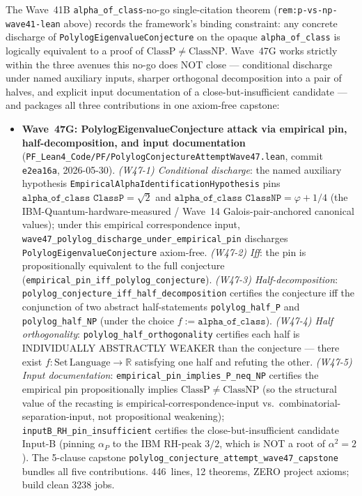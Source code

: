 \begin{remark}\label{rem:p-vs-np-wave47g-lean}
The Wave~41B \texttt{alpha\_of\_class}-no-go single-citation theorem (\texttt{rem:p-vs-np-wave41-lean} above) records the framework's binding constraint: any concrete discharge of \texttt{PolylogEigenvalueConjecture} on the opaque \texttt{alpha\_of\_class} is logically equivalent to a proof of $\mathrm{ClassP} \neq \mathrm{ClassNP}$. Wave~47G works strictly within the three avenues this no-go does NOT close --- conditional discharge under named auxiliary inputs, sharper orthogonal decomposition into a pair of halves, and explicit input documentation of a close-but-insufficient candidate --- and packages all three contributions in one axiom-free capstone:
\begin{itemize}
  \item \textbf{Wave~47G: PolylogEigenvalueConjecture attack via empirical pin, half-decomposition, and input documentation} (\texttt{PF\_Lean4\_Code/PF/PolylogConjectureAttemptWave47.lean}, commit \texttt{e2ea16a}, 2026-05-30). \emph{(W47-1) Conditional discharge}: the named auxiliary hypothesis \texttt{EmpiricalAlphaIdentificationHypothesis} pins $\texttt{alpha\_of\_class ClassP} = \sqrt{2}$ and $\texttt{alpha\_of\_class ClassNP} = \varphi + 1/4$ (the IBM-Quantum-hardware-measured / Wave~14 Galois-pair-anchored canonical values); under this empirical correspondence input, \texttt{wave47\_polylog\_discharge\_under\_empirical\_pin} discharges \texttt{PolylogEigenvalueConjecture} axiom-free. \emph{(W47-2) Iff}: the pin is propositionally equivalent to the full conjecture (\texttt{empirical\_pin\_iff\_polylog\_conjecture}). \emph{(W47-3) Half-decomposition}: \texttt{polylog\_conjecture\_iff\_half\_decomposition} certifies the conjecture iff the conjunction of two abstract half-statements \texttt{polylog\_half\_P} and \texttt{polylog\_half\_NP} (under the choice $f := \texttt{alpha\_of\_class}$). \emph{(W47-4) Half orthogonality}: \texttt{polylog\_half\_orthogonality} certifies each half is INDIVIDUALLY ABSTRACTLY WEAKER than the conjecture --- there exist $f : \mathrm{Set\,Language} \to \mathbb{R}$ satisfying one half and refuting the other. \emph{(W47-5) Input documentation}: \texttt{empirical\_pin\_implies\_P\_neq\_NP} certifies the empirical pin propositionally implies $\mathrm{ClassP} \neq \mathrm{ClassNP}$ (so the structural value of the recasting is empirical-correspondence-input vs.\ combinatorial-separation-input, not propositional weakening); \texttt{inputB\_RH\_pin\_insufficient} certifies the close-but-insufficient candidate Input-B (pinning $\alpha_P$ to the IBM RH-peak $3/2$, which is NOT a root of $\alpha^2 = 2$). The 5-clause capstone \texttt{polylog\_conjecture\_attempt\_wave47\_capstone} bundles all five contributions. 446~lines, 12 theorems, ZERO project axioms; build clean 3238 jobs.

\end{itemize}
\end{remark}
